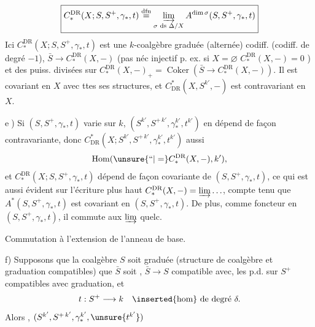 \[
\boxed{C_*^{\mathrm{DR}}(X;S,S^+,\gamma_*,t)\overset{\mathrm{dfn}}=\varinjlim_{\sigma\text{ ds }\Delta/X} A^{\dim\sigma}(S,S^+,\gamma_*,t)}
\]
Ici $C_*^{\mathrm{DR}}(X;S,S^+,\gamma_*,t)$ est une $k$-coalgèbre graduée (alternée) codiff. (codiff. de degré $-1$),     $\bar S\longrightarrow C_*^{\mathrm{DR}}(X,-)$  (pas néc injectif p. ex. si $X=\varnothing$ $C_*^{\mathrm{DR}}(X,-)=0$ \unsure{--}) et des puiss. divisées sur  $C_*^{\mathrm{DR}}(X,-)_+=\operatorname{Coker}(\bar S\longrightarrow C_*^{\mathrm{DR}}(X,-))$. Il est covariant en $X$ avec ttes ses structures, et $C^*_{\mathrm{DR}}(X,S^{k'},-)$ est contravariant en $X$. 


\textcircled{e)} Si $(S,S^+,\gamma_*,t)$ varie sur $k$, $(S^{k'},S^{+\,k'},\gamma_*^{k'},t^{k'})$ en dépend de façon contravariante, donc $C^*_{\mathrm{DR}}(X;S^{k'},S^{+\,k'},\gamma_*^{k'},t^{k'})$ aussi
\[
 \operatorname{Hom}(\unsure{\text{``}|=}C_*^{\mathrm{DR}}(X,-),k'),
\]
et $C_*^{\mathrm{DR}}(X;S,S^+,\gamma_*,t)$ dépend de façon covariante de $(S,S^+,\gamma_*,t)$, ce qui est aussi évident sur l'écriture plus haut $C_*^{\mathrm{DR}}(X,-)=\varinjlim\ldots$, compte tenu que $A^*(S,S^+,\gamma_*,t)$ est covariant en $(S,S^+,\gamma_*,t)$. De plus,  comme foncteur en $(S,S^+,\gamma_*,t)$, il commute aux $\varinjlim$ quelc.

Commutation à l'extension de l'anneau de base.

f) Supposons que la coalgèbre $S$ soit graduée (structure de coalgèbre et graduation compatibles) que $\bar S$ soit , $\bar S\longrightarrow S$ compatible avec, les p.d. sur $S^+$ compatibles avec graduation, et
\[
 t:S^+\longrightarrow k\quad\inserted{\text{hom}}\ \text{de degré }\delta.
\]
Alors  , $(S^{k'},S^{+\,k'},\gamma_*^{k'},\unsure{t^{k'}})$
